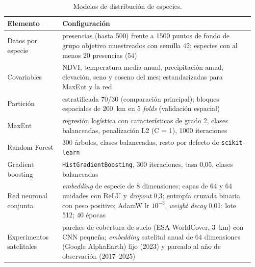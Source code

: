 \begin{table}[H]
  \centering\small
  \caption{Modelos de distribución de especies.}
  \label{tab:hp-sdm}
  \begin{tabularx}{\textwidth}{@{}>{\raggedright\arraybackslash}p{3.1cm} X@{}}
    \toprule
    Elemento & Configuración \\
    \midrule
    Datos por especie & presencias (hasta 500) frente a \num{1500} puntos de fondo de grupo objetivo muestreados con semilla 42; especies con al menos 20 presencias (54) \\
    Covariables & NDVI, temperatura media anual, precipitación anual, elevación, seno y coseno del mes; estandarizadas para MaxEnt y la red \\
    Partición & estratificada 70/30 (comparación principal); bloques espaciales de \SI{200}{\kilo\metre} en 5 \textit{folds} (validación espacial) \\
    MaxEnt & regresión logística con características de grado 2, clases balanceadas, penalización L2 (C = 1), \num{1000} iteraciones \\
    Random Forest & 300 árboles, clases balanceadas, resto por defecto de \texttt{scikit-learn} \\
    Gradient boosting & \texttt{HistGradientBoosting}, 300 iteraciones, tasa 0,05, clases balanceadas \\
    Red neuronal conjunta & \textit{embedding} de especie de 8 dimensiones; capas de 64 y 64 unidades con ReLU y \textit{dropout} 0,3; entropía cruzada binaria con peso positivo; AdamW lr $10^{-3}$, \textit{weight decay} 0,01; lote 512; 40 épocas \\
    Experimentos satelitales & parches de cobertura de suelo (ESA WorldCover, \SI{3}{\kilo\metre}) con CNN pequeña; \textit{embedding} satelital anual de 64 dimensiones (Google AlphaEarth) fijo (2023) y pareado al año de observación (2017--2025) \\
    \bottomrule
  \end{tabularx}
\end{table}

